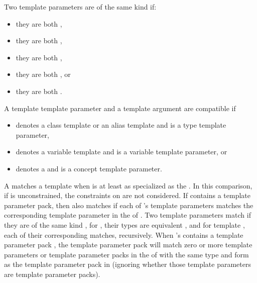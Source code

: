 \documentclass{wg21}
\begin{document}
\begin{addedblock}
Two template parameters are of the same kind if:
\begin{itemize}
\item they are both ,
\item they are both ,
\item they are both ,
\item they are both , or
\item they are both .
\end{itemize}

A template template parameter  and a template argument  are compatible if
\begin{itemize}
\item {} denotes a class template or an alias template and  is a type template parameter,
\item {} denotes a variable template and  is a variable template parameter, or
\item {} denotes a  and  is a concept template parameter.
\end{itemize}
\end{addedblock}


\pnum
A  matches a template
  when 
 is at least as specialized as the  .
In this comparison, if  is unconstrained,
the constraints on  are not considered.
If  contains a template parameter pack, then  also matches 
if each of 's template parameters
matches the corresponding template parameter in the
 of .
Two template parameters match if they are of the same kind ,
for  , their types are
equivalent , and for template ,
each of their corresponding  matches, recursively.
When 's  contains a template parameter
pack , the template parameter pack will match zero or more template
parameters or template parameter packs in the  of
 with the same type and form as the template parameter pack in 
(ignoring whether those template parameters are template parameter packs).
\end{document}
